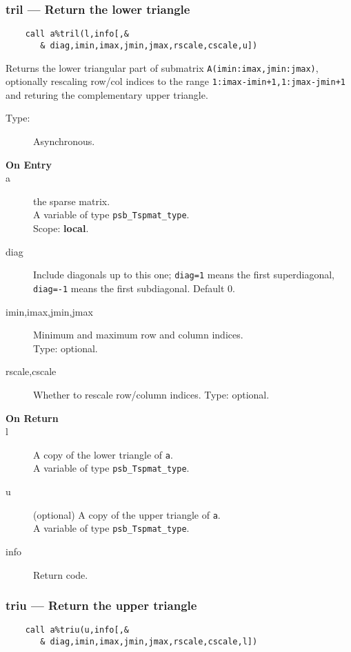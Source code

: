 \subsubsection{tril --- Return the lower triangle}
\begin{verbatim}
    call a%tril(l,info[,&
       & diag,imin,imax,jmin,jmax,rscale,cscale,u])
\end{verbatim}

Returns the lower triangular part of submatrix
\verb|A(imin:imax,jmin:jmax)|, optionally rescaling row/col indices to
the range \verb|1:imax-imin+1,1:jmax-jmin+1| and returing the
complementary upper triangle. 
\begin{description}
\item[Type:] Asynchronous.
\item[\bf On Entry]
\item[a] the sparse matrix.\\
A variable of type \verb|psb_Tspmat_type|.\\
Scope: {\bf local}.\\
\item[diag] Include diagonals up to this one; \verb|diag=1| means the
  first superdiagonal, \verb|diag=-1| means the first subdiagonal. 
Default 0.
\item[imin,imax,jmin,jmax] Minimum and maximum row and column indices.\\
Type: optional.
\item[rscale,cscale] Whether to rescale row/column indices.
Type: optional.
\end{description}
\begin{description}
\item[\bf On Return]
\item[l] A copy  of the lower triangle of \verb|a|.\\
A variable of type \verb|psb_Tspmat_type|.
\item[u] (optional) A copy  of the upper triangle of \verb|a|.\\
A variable of type \verb|psb_Tspmat_type|.
\item[info] Return code. 
\end{description}

\subsubsection{triu --- Return the upper triangle}
\begin{verbatim}
    call a%triu(u,info[,&
       & diag,imin,imax,jmin,jmax,rscale,cscale,l])
\end{verbatim}

